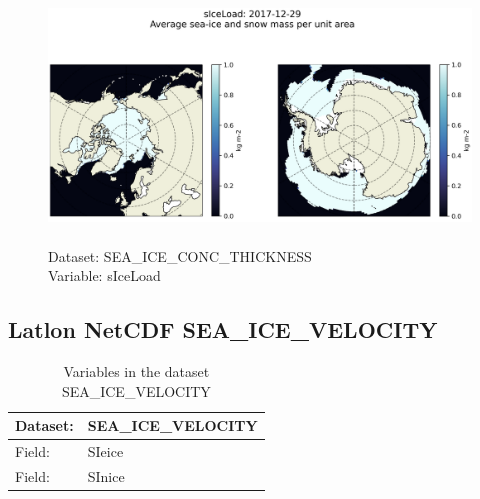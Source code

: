 \begin{figure}[H]
\centering
\includegraphics[scale=0.5]{../images/plots/latlon_plots/Sea-Ice_and_Snow_Concentration_and_Thickness/sIceLoad.png}
\caption{\\Dataset: SEA\_ICE\_CONC\_THICKNESS\\Variable: sIceLoad}
\label{tab:table-SEA_ICE_CONC_THICKNESS_sIceLoad-Plot}
\end{figure}
\pagebreak
\subsection{Latlon NetCDF SEA\_ICE\_VELOCITY}
\newp
\begin{longtable}{|p{}|p{}|}
\caption{Variables in the dataset SEA\_ICE\_VELOCITY}
\label{tab:table-SEA_ICE_VELOCITY-fields} \\ 
\hline \endhead \hline \endfoot
\rowcolor{lightgray} \textbf{Dataset:} & \textbf{SEA\_ICE\_VELOCITY} \\ \hline
Field: &SIeice \\ \hline
Field: &SInice \\ \hline
\end{longtable}

\pagebreak
